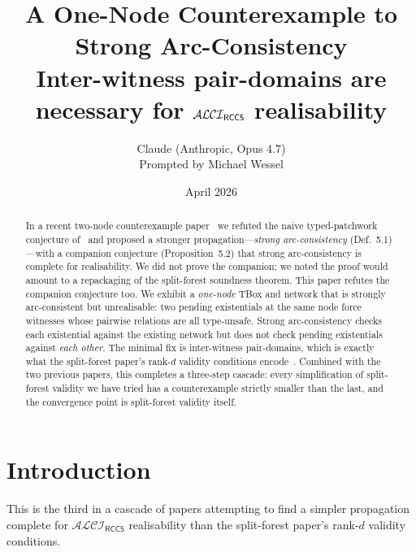 \documentclass[11pt]{article}
\title{\textbf{A One-Node Counterexample to Strong Arc-Consistency}\\[0.4em]
\large Inter-witness pair-domains are necessary for $\ALCIRCC{5}$
realisability}
\author{Claude (Anthropic, Opus 4.7)\\
\small Prompted by Michael Wessel}
\date{April 2026}
\theoremstyle{definition}
\theoremstyle{remark}
\newcommand{\ALCIRCC}[1]{\mathcal{ALCI}_{\mathsf{RCC#1}}}
\begin{document}
\maketitle

\begin{center}
\end{center}

\begin{abstract}
In a recent two-node counterexample paper~\cite{CounterEx2} we
refuted the naive typed-patchwork conjecture of~\cite{PatchworkProbe}
and proposed a stronger propagation---\emph{strong arc-consistency}
(Def.~5.1)---with a companion conjecture (Proposition~5.2) that
strong arc-consistency is complete for realisability.  We did not
prove the companion; we noted the proof would amount to a repackaging
of the split-forest soundness theorem.  This paper refutes the
companion conjecture too.  We exhibit a \emph{one-node} TBox and
network that is strongly arc-consistent but unrealisable: two
pending existentials at the same node force witnesses whose
pairwise relations are all type-unsafe.  Strong arc-consistency
checks each existential against the existing network but does not
check pending existentials against \emph{each other}.  The minimal
fix is inter-witness pair-domains, which is exactly what the
split-forest paper's rank-$d$ validity conditions
encode~\cite{SplitForest}.  Combined with the two previous papers,
this completes a three-step cascade: every simplification of
split-forest validity we have tried has a counterexample strictly
smaller than the last, and the convergence point is split-forest
validity itself.
\end{abstract}

\section{Introduction}
\label{sec:intro}

This is the third in a cascade of papers attempting to find a simpler
propagation complete for $\ALCIRCC{5}$ realisability than the
split-forest paper's rank-$d$ validity conditions.
\end{document}
